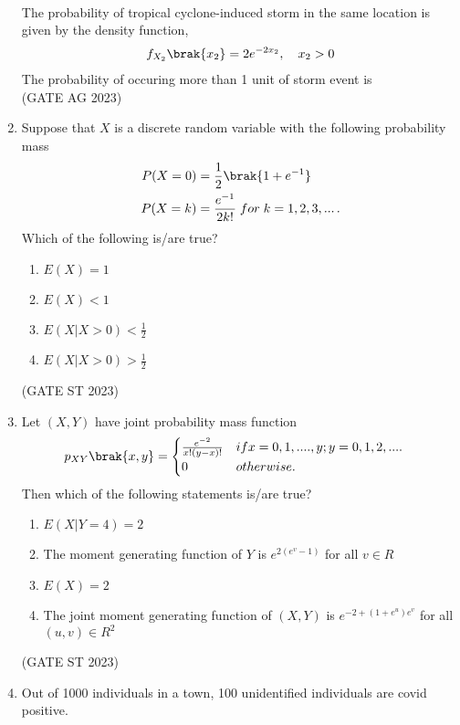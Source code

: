 \begin{enumerate}[label=\thechapter.\arabic*,ref=\thechapter.\theenumi]
\begin{align}
\end{align} 
The probability of tropical cyclone-induced storm in the same location is given by the density function,
\begin{align}
f_{X_2}\brak{x_2} = 2e^{-2x_2},\quad x_2>0
\end{align}
The probability of occuring more than 1 unit of storm event is\\
\hfill(GATE AG 2023)\\

\item Suppose that $X$ is a discrete random variable with the following probability mass
\begin{align}
	P(X=0)&=\frac{1}{2}\brak{1+e^{-1}}\\
	P(X=k)&=\frac{e^{-1}}{2k!} \; for \; k=1,2,3,... \, .
\end{align}
Which of the following is/are true?
\begin{enumerate}
	\item $E(X)=1$
	\item $E(X)<1$
	\item $E(X|X>0)<\frac{1}{2}$
	\item $E(X|X>0)>\frac{1}{2}$
\end{enumerate}
\hfill (GATE ST 2023)\\

\item Let $(X,Y)$ have joint probability mass function
\begin{align}
p_{XY}\brak{x,y}&=
\begin{cases}
\frac{e^{-2}}{x!(y - x)!} & if x = 0,1,....,y; y = 0,1,2,....\\
0 & otherwise.\\
\end{cases}
\end{align}
Then which of the following statements is/are true?
\begin{enumerate}
\item ${E(X|Y = 4) = 2}$
\item The moment generating function of $Y$ is $e^{2(e^v - 1)}$ for all $v \in R$
\item ${E(X) = 2}$
\item The joint moment generating function of $(X,Y)$ is $e^{-2+(1 + e^u)e^v}$ for all $(u,v) \in {R^2}$
\end{enumerate}
\hfill(GATE ST 2023)\\

\item Out of 1000 individuals in a town, 100 unidentified individuals are covid positive.

\end{enumerate}
